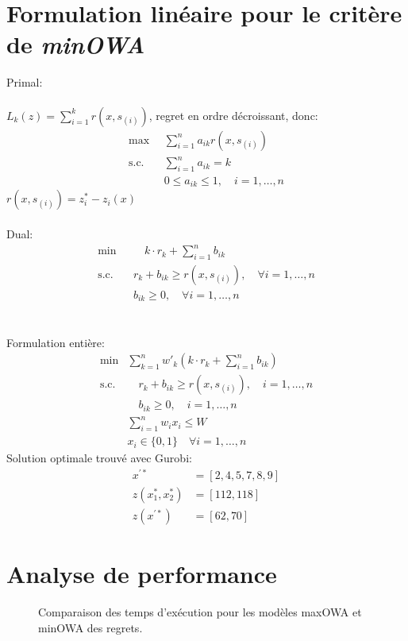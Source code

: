 \documentclass[10pt,a4paper]{report}
\begin{document}
\section{Formulation linéaire pour le critère de \textit{minOWA}}
Primal:\\\\
$L_k(z)=\sum_{i=1}^{k} r(x,s_{(i)})$, regret en ordre décroissant, donc:\\
\begin{align*}
    \max &\sum_{i=1}^n a_{ik} r(x,s_{(i)})\\
\text{s.c.} \quad & \sum_{i=1}^{n} a_{ik} = k \\
& 0 \leq a_{ik} \leq 1, \quad i = 1, \dots, n
\end{align*}
$r(x,s_{(i)}) = z_i^*-z_i(x)$\\\\
Dual:
\begin{align*}
\min & \quad k \cdot r_k + \sum_{i=1}^{n} b_{ik} \\
\text{s.c.} \quad & r_k + b_{ik} \geq r(x,s_{(i)}), \quad \forall i = 1, \dots, n \\
& b_{ik} \geq 0, \quad \forall i = 1, \dots, n
\end{align*}\\\\
Formulation entière:
\begin{align*}
\min &\sum_{k=1}^n w'_k \left( k \cdot r_k + \sum_{i=1}^n b_{ik} \right) \\
\text{s.c.} & \quad r_k + b_{ik} \geq r(x,s_{(i)}), \quad i = 1, \dots, n \\
& \quad b_{ik} \geq 0, \quad i = 1, \dots, n \\
& \sum_{i=1}^{n} w_i x_i \leq W\\
&x_i\in\{0,1\}\quad \forall i=1, \dots,n
\end{align*}
Solution optimale trouvé avec Gurobi:
\begin{align*}
	x^{'*} 	&= [2, 4, 5, 7, 8, 9]\\
	z(x_1^*,x_2^*) &= [112,118]\\ 
	z(x^{'*}) 	&= [62,70]
\end{align*}
\section{Analyse de performance}
\begin{figure}[h!]
    \centering
      
    \caption{Comparaison des temps d'exécution pour les modèles maxOWA et minOWA des regrets.}
    \label{fig:performance_ex2}
\end{figure}
\end{document}
